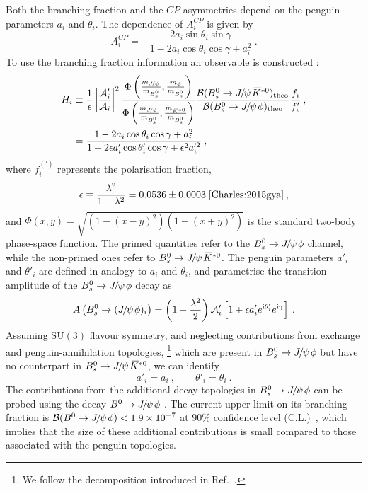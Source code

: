 \documentclass[12pt,a4paper]{article}
\def\grpsuthree {{\ensuremath{\mathrm{SU}(3)}}\xspace}
\newcommand{\CP}{\ensuremath{{C\!P}}\xspace}
\def\PJ      {\ensuremath{J}\xspace}
\def\CP                {\ensuremath{C\!P}\xspace}
\def\Ppsi {\ensuremath{\psi}\xspace}
\def\jpsi     {{\ensuremath{{\PJ\mskip -3mu/\mskip -2mu\Ppsi\mskip 2mu}}}\xspace}
\newcommand{\Bs}{\ensuremath{B^0_s}\xspace}
\newcommand{\Bd}{\ensuremath{B^0}\xspace}
\newcommand{\BsJpsiKst}{\ensuremath{B^0_s\to \jpsi \Kstarzb}\xspace}
\newcommand{\BsJpsiPhi}{\ensuremath{B^0_s\to \jpsi \phi}\xspace}
\def\Kbar  {\kern 0.2em\overline{\kern -0.2em K}{}\xspace}
\def\Kstarzb {\ensuremath{\Kbar^{*0}}\xspace}
\newcommand{\BRof}[1]{\ensuremath{{\cal B}(#1)}\xspace}
\newcommand{\BR}{\BRof}
\begin{document}
Both the branching fraction and the \CP asymmetries depend on the penguin parameters $a_i$ 
and $\theta_i$. The dependence of $A^{\CP}_i$ is given by \cite{Fleischer:1999zi}
\begin{equation}\label{Eq:ACP_penguin}
A^{\CP}_i= -\frac{2a_i\sin\theta_i\sin\gamma}{1-2a_i\cos\theta_i\cos\gamma+a_i^{2}}\:.
\end{equation}
To use the branching fraction information an observable is constructed \cite{Fleischer:1999zi}:
\begin{align}\label{Eq:H_penguin}
H_i & \equiv  \frac{1}{\epsilon} \left|\frac{\mathcal{A}'_i}{\mathcal{A}_i}\right|^2
\frac{\Phi\left(\frac{m_{\jpsi}}{m_{\Bs}}, \frac{m_{\phi}}{m_{\Bs}}\right)}{\Phi\left(\frac{m_{\jpsi}}{m_{\Bs}}, \frac{m_{\Kstarzb}}{m_{\Bs}}\right)}
\frac{\BR{\BsJpsiKst}_{\text{theo}}}{\BR{\BsJpsiPhi}_{\text{theo}}}
\frac{f_i}{f'_i}\:, \\ 
& = \frac{1-2a_i \cos\theta_i \cos\gamma+a_i^{2}}{1+2\epsilon a'_i \cos\theta'_i\cos\gamma +\epsilon^2 a_i^{\prime 2}} \:,\nonumber
\end{align}
where $f_i^{(\prime)}$ represents the polarisation fraction, 
\begin{equation}
\epsilon \equiv \frac{\lambda^2}{1-\lambda^2} = 0.0536 \pm 0.0003\; \mbox{\cite{Charles:2015gya}}\:,
\end{equation}
and $\Phi(x,y) = \sqrt{(1-(x-y)^2)(1-(x+y)^2)}$ is the standard two-body phase-space function.
The primed quantities refer to the $\BsJpsiPhi$ channel, while the non-primed ones refer to $\BsJpsiKst$.
The penguin parameters $a'_i$ and $\theta'_i$ are defined in analogy to $a_i$ and $\theta_i$, and parametrise the transition amplitude of the $\BsJpsiPhi$ decay as
\begin{equation}
A\left(\Bs\to (\jpsi{}\phi)_i\right) = \left(1-\frac{\lambda^2}{2}\right)\mathcal{A}'_i \left[1+\epsilon a'_ie^{\text{i}\theta'_i}e^{\text{i}\gamma}\right]\:.
\end{equation}
Assuming \grpsuthree flavour symmetry, and neglecting contributions from exchange and penguin-annihilation topologies,
\footnote{We follow the decomposition introduced in Ref.~\cite{Gronau:1995hm}.}
which are present in $\BsJpsiPhi$ but have no counterpart in $\BsJpsiKst$, we can identify
\begin{equation}\label{Eq:SU3_atheta}
a'_i = a_i\:,\qquad \theta'_i = \theta_i\:.
\end{equation}
The contributions from the additional decay topologies in $\BsJpsiPhi$ can be probed using the decay $\Bd\to\jpsi{}\phi$ \cite{DeBruyn:2014oga}.
The current upper limit on its branching fraction is $\BR{\Bd\to\jpsi{}\phi} < 1.9\times 10^{-7}$ at 90\% confidence level (C.L.)~\cite{LHCB-PAPER-2013-045}, which implies that the size of these additional contributions is small compared to those associated with the penguin topologies.
\end{document}

